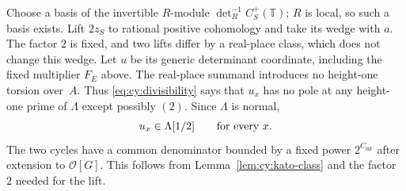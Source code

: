 Choose a basis of the invertible $R$-module
$\det_R^{-1}C_S^+(\mathbb T)$; $R$ is local, so such a basis exists.
Lift $2z_S$ to rational positive cohomology and take its wedge with $a$.
The factor $2$ is fixed, and two lifts differ by a real-place class,
which does not change this wedge.  Let $u$ be its generic determinant
coordinate, including the fixed multiplier $F_E$ above.  The real-place
summand introduces no height-one torsion over~$A$.  Thus
\eqref{eq:cy:divisibility} says that $u_x$ has no pole at any height-one
prime of $\Lambda$ except possibly $(2)$.  Since $\Lambda$ is normal,
\begin{equation}\label{eq:cy:rational-integrality}
 u_x\in\Lambda[1/2]\qquad\hbox{for every }x.
\end{equation}
The two cycles have a common denominator bounded by a fixed power
$2^{C_{\mathrm{int}}}$ after extension to $\mathcal O[G]$. This follows
from Lemma~\ref{lem:cy:kato-class} and the factor $2$ needed for the lift.

